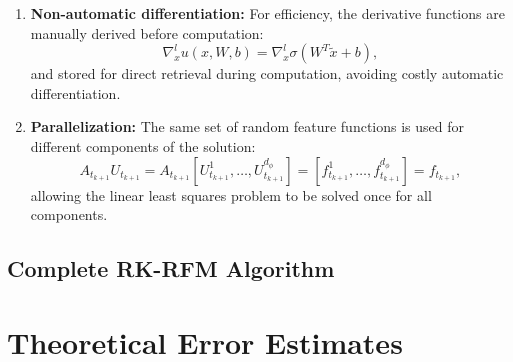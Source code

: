 \documentclass[11pt]{article}
\begin{document}
\begin{enumerate}
    \item \textbf{Non-automatic differentiation:} For efficiency, the derivative functions are manually derived before computation:
    \begin{equation}
        \nabla^l_x u(x,W,b) = \nabla^l_x \sigma(W^T\tilde{x}+b),
    \end{equation}
    and stored for direct retrieval during computation, avoiding costly automatic differentiation.
    
    \item \textbf{Parallelization:} The same set of random feature functions is used for different components of the solution:
    \begin{equation}
        A_{t_{k+1}}U_{t_{k+1}} = A_{t_{k+1}}[U^1_{t_{k+1}}, \ldots, U^{d_\phi}_{t_{k+1}}] = [f^1_{t_{k+1}}, \ldots, f^{d_\phi}_{t_{k+1}}] = f_{t_{k+1}},
    \end{equation}
    allowing the linear least squares problem to be solved once for all components.
\end{enumerate}

\subsection{Complete RK-RFM Algorithm}

\begin{algorithm}
\caption{The Runge--Kutta Random Feature Method}
\begin{algorithmic}[1]
\ENDFOR
{}
\end{algorithmic}
\end{algorithm}

\section{Theoretical Error Estimates}
\end{document}
